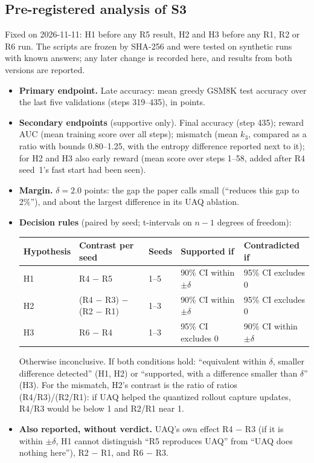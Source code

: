 \documentclass[11pt]{article}
\begin{document}
\subsection{Pre-registered analysis of S3}\label{sec:prereg}
Fixed on 2026-11-11: H1 before any R5 result, H2 and H3 before any R1, R2 or R6 run. The scripts are frozen by SHA-256 and were tested on synthetic runs with known answers; any later change is recorded here, and results from both versions are reported.
\begin{itemize}
\item \textbf{Primary endpoint.} Late accuracy: mean greedy GSM8K test accuracy over the last five validations (steps 319--435), in points.
\item \textbf{Secondary endpoints} (supportive only). Final accuracy (step 435); reward AUC (mean training score over all steps); mismatch (mean $k_3$, compared as a ratio with bounds 0.80--1.25, with the entropy difference reported next to it); for H2 and H3 also early reward (mean score over steps 1--58, added after R4 seed~1's fast start had been seen).
\item \textbf{Margin.} $\delta=2.0$ points: the gap the paper calls small (``reduces this gap to 2\%''), and about the largest difference in its UAQ ablation.
\item \textbf{Decision rules} (paired by seed; t-intervals on $n-1$ degrees of freedom):
\begin{center}\small
\begin{tabular}{@{}lllll@{}}
\toprule
Hypothesis & Contrast per seed & Seeds & Supported if & Contradicted if\\
\midrule
H1 & R4 $-$ R5 & 1--5 & 90\% CI within $\pm\delta$ & 95\% CI excludes 0\\
H2 & (R4 $-$ R3) $-$ (R2 $-$ R1) & 1--3 & 90\% CI within $\pm\delta$ & 95\% CI excludes 0\\
H3 & R6 $-$ R4 & 1--3 & 95\% CI excludes 0 & 90\% CI within $\pm\delta$\\
\bottomrule
\end{tabular}
\end{center}
Otherwise inconclusive. If both conditions hold: ``equivalent within $\delta$, smaller difference detected'' (H1, H2) or ``supported, with a difference smaller than $\delta$'' (H3). For the mismatch, H2's contrast is the ratio of ratios (R4/R3)/(R2/R1): if UAQ helped the quantized rollout capture updates, R4/R3 would be below 1 and R2/R1 near 1.
\item \textbf{Also reported, without verdict.} UAQ's own effect R4 $-$ R3 (if it is within $\pm\delta$, H1 cannot distinguish ``R5 reproduces UAQ'' from ``UAQ does nothing here''), R2 $-$ R1, and R6 $-$ R3.

\end{itemize}
\end{document}
